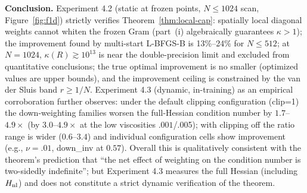\documentclass[11pt]{article}
\numberwithin{equation}{section}
\begin{document}
\noindent\textbf{Conclusion.} Experiment 4.2 (static at frozen points, $N\le1024$ scan, Figure~\ref{fig:f1d}) strictly verifies Theorem~\ref{thm:local-cap}: spatially local diagonal weights cannot whiten the frozen Gram (part~(i) algebraically guarantees $\kappa>1$); the improvement found by multi-start L-BFGS-B is 13\%--24\% for $N\le512$; at $N=1024$, $\kappa(R)\gtrsim10^{13}$ is near the double-precision limit and excluded from quantitative conclusions; the true optimal improvement is no smaller (optimized values are upper bounds), and the improvement ceiling is constrained by the van der Sluis band $r\ge1/N$. Experiment 4.3 (dynamic, in-training) as an empirical corroboration further observes: under the default clipping configuration (clip=1) the down-weighting families worsen the full-Hessian condition number by $1.7$--$4.9\times$ (by $3.0$--$4.9\times$ at the low viscosities $.001$/.005); with clipping off the ratio range is wider ($0.6$--$3.4$) and individual configuration cells show improvement (e.g., $\nu=.01$, down\_inv at $0.57$). Overall this is qualitatively consistent with the theorem's prediction that ``the net effect of weighting on the condition number is two-sidedly indefinite''; but Experiment 4.3 measures the full Hessian (including $H_{\rm nl}$) and does not constitute a strict dynamic verification of the theorem.
\end{document}
